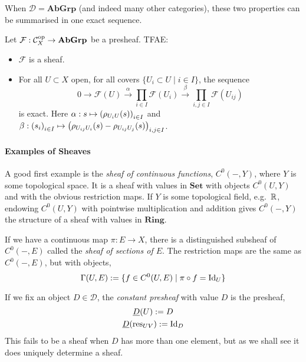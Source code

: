 \documentclass[000-main.tex]{subfiles}
\begin{document}
When $\mathcal{D} = \mathbf{AbGrp}$ (and indeed many other categories), these two properties can be summarised in one exact sequence.
\begin{proposition}
  Let $\mathcal{F}: \mathcal{C}_X^{\text{op}} \to \mathbf{AbGrp}$ be a presheaf. TFAE:\@
  \begin{itemize}
    \item $\mathcal{F}$ is a sheaf.
    \item For all $U\subset X$ open, for all covers $\{U_i\subset U\mid i\in I\}$, the sequence
          \begin{displaymath}
            0 \to \mathcal{F}(U) \xrightarrow{\alpha} \prod_{i\in I}\mathcal{F}(U_i) \xrightarrow{\beta} \prod_{i, j\in I}\mathcal{F}(U_{ij})
          \end{displaymath}
          is exact.
          Here $\alpha: s\mapsto {\qty(\rho_{U_i U}(s))}_{i\in I}$ and $\beta: {(s_i)}_{i\in I} \mapsto {\qty(\rho_{U_{ij} U_i}(s) - \rho_{U_{ij} U_j}(s))}_{i, j\in I}$.
  \end{itemize}
\end{proposition}

\paragraph{Examples of Sheaves}

A good first example is the \emph{sheaf of continuous functions}, $C^0(-, Y)$, where $Y$ is some topological space.
It is a sheaf with values in $\mathbf{Set}$ with objects $C^0(U, Y)$ and with the obvious restriction maps.
If $Y$ is some topological field, e.g.\ $\mathbb{R}$, endowing $C^0(U, Y)$ with pointwise multiplication and addition gives $C^0(-, Y)$ the structure of a sheaf with values in $\mathbf{Ring}$.

If we have a continuous map $\pi: E\to X$, there is a distinguished subsheaf of $C^0(-, E)$ called the \emph{sheaf of sections of $E$}.
The restriction maps are the same as $C^0(-, E)$, but with objects,
\begin{displaymath}
  \Gamma(U, E) := \{f\in C^0(U, E)\mid \pi\circ f = \operatorname{Id}_U\}
\end{displaymath}

If we fix an object $D\in \mathcal{D}$, the \emph{constant presheaf} with value $D$ is the presheaf,
\begin{displaymath}
  \begin{gathered}
    \underline{D}(U) := D\\
    \underline{D}\qty(\operatorname{res}_{UV}) := \operatorname{Id}_D
  \end{gathered}
\end{displaymath}
This fails to be a sheaf when $D$ has more than one element, but as we shall see it does uniquely determine a sheaf.
\end{document}
